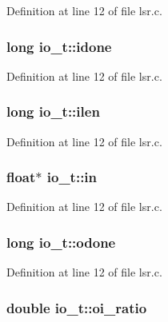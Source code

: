 Definition at line 12 of file lsr.\+c.

\subsubsection[{\texorpdfstring{idone}{idone}}]{\setlength{\rightskip}{0pt plus 5cm}long io\+\_\+t\+::idone}\hypertarget{structio__t_a6b516e6573f44ec3439ba54dd01a3d6d}{}\label{structio__t_a6b516e6573f44ec3439ba54dd01a3d6d}


Definition at line 12 of file lsr.\+c.

\subsubsection[{\texorpdfstring{ilen}{ilen}}]{\setlength{\rightskip}{0pt plus 5cm}long io\+\_\+t\+::ilen}\hypertarget{structio__t_a35fa9a6d9d270f8b0cfac647fc601320}{}\label{structio__t_a35fa9a6d9d270f8b0cfac647fc601320}


Definition at line 12 of file lsr.\+c.

\subsubsection[{\texorpdfstring{in}{in}}]{\setlength{\rightskip}{0pt plus 5cm}float$\ast$ io\+\_\+t\+::in}\hypertarget{structio__t_a14bfa8629c0718832491dfce0a901541}{}\label{structio__t_a14bfa8629c0718832491dfce0a901541}


Definition at line 12 of file lsr.\+c.

\subsubsection[{\texorpdfstring{odone}{odone}}]{\setlength{\rightskip}{0pt plus 5cm}long io\+\_\+t\+::odone}\hypertarget{structio__t_a214ab873ded1d3f2848e96b2826fd541}{}\label{structio__t_a214ab873ded1d3f2848e96b2826fd541}


Definition at line 12 of file lsr.\+c.

\subsubsection[{\texorpdfstring{oi\+\_\+ratio}{oi_ratio}}]{\setlength{\rightskip}{0pt plus 5cm}double io\+\_\+t\+::oi\+\_\+ratio}\hypertarget{structio__t_abe24f477b0a765c6cfdd143aa55d892e}{}\label{structio__t_abe24f477b0a765c6cfdd143aa55d892e}


